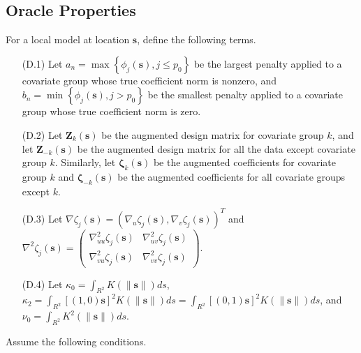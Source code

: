 \documentclass[authoryear,review, 12pt]{elsarticle}
\begin{document}
\subsection{Oracle Properties\label{sub:oracle-properties}}

For a local model at location $\bm{s}$, define the following terms.
\begin{itemize}
\item[(D.1)] Let $a_{n}=\max\left\{ \phi_{j}\left(\bm{s}\right),j\le p_{0}\right\} $
be the largest penalty applied to a covariate group whose true coefficient
norm is nonzero, and $b_{n}=\min\left\{ \phi_{j}\left(\bm{s}\right),j>p_{0}\right\} $
be the smallest penalty applied to a covariate group whose true coefficient
norm is zero.
\item[(D.2)] Let $\bm{Z}_{k}\left(\bm{s}\right)$ be the augmented design matrix
for covariate group $k$, and let $\bm{Z}_{-k}\left(\bm{s}\right)$
be the augmented design matrix for all the data except covariate group
$k$. Similarly, let $\bm{\zeta}_{k}\left(\bm{s}\right)$ be the augmented
coefficients for covariate group $k$ and $\bm{\zeta}_{-k}\left(\bm{s}\right)$
be the augmented coefficients for all covariate groups except $k$.
\item[(D.3)] Let $\nabla\zeta_{j}\left(\bm{s}\right)=\left(\nabla_{u}\zeta_{j}\left(\bm{s}\right),\nabla_{v}\zeta_{j}\left(\bm{s}\right)\right)^{T}$
and $\nabla^{2}\zeta_{j}\left(\bm{s}\right)=\left(\begin{array}{cc}
\nabla_{uu}^{2}\zeta_{j}\left(\bm{s}\right) & \nabla_{uv}^{2}\zeta_{j}\left(\bm{s}\right)\\
\nabla_{vu}^{2}\zeta_{j}\left(\bm{s}\right) & \nabla_{vv}^{2}\zeta_{j}\left(\bm{s}\right)
\end{array}\right)$.
\item[(D.4)] Let $\kappa_{0}=\int_{R^{2}}K\left(\|\bm{s}\|\right)ds$, $\kappa_{2}=\int_{R^{2}}[(1,0)\bm{s}]^{2}K\left(\|\bm{s}\|\right)ds=\int_{R^{2}}[(0,1)\bm{s}]^{2}K\left(\|\bm{s}\|\right)ds$,
and $\nu_{0}=\int_{R^{2}}K^{2}\left(\|\bm{s}\|\right)ds$.
\end{itemize}
Assume the following conditions.
\end{document}
